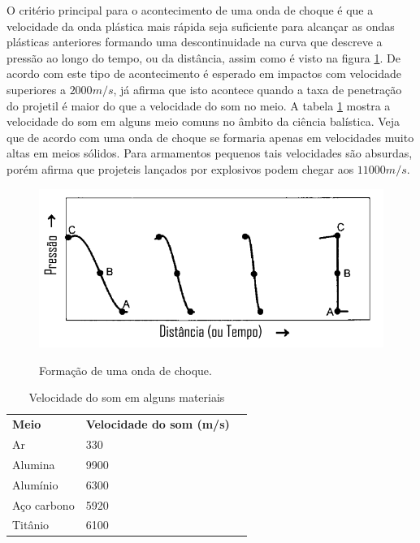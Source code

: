  O critério principal para o acontecimento de uma onda de choque é que a velocidade da onda plástica mais rápida seja suficiente para alcançar as ondas plásticas anteriores formando uma descontinuidade na curva que descreve a pressão ao longo do tempo, ou da distância, assim como é visto na figura \ref{fig:buildshock}. De acordo com \cite{Zukas} este tipo de acontecimento é esperado em impactos com velocidade superiores a $2000 m/s$, já \cite{Hazell} afirma que isto acontece quando a taxa de penetração do projetil é maior do que a velocidade do som no meio. A tabela \ref{tab:veldosom} mostra a velocidade do som em alguns meio comuns no âmbito da ciência balística. Veja que de acordo com \cite{Hazell} uma onda de choque se formaria apenas em velocidades muito altas em meios sólidos. Para armamentos pequenos tais velocidades são absurdas, porém \cite{Hazell} afirma que projeteis lançados por explosivos podem chegar aos $11000 m/s$.
 
  \begin{figure} [H]
     \centering
     \caption{Formação de uma onda de choque.}
     \includegraphics[width=0.5\linewidth]{images/buildshock.png}
     \label{fig:buildshock}
 \end{figure}
 
 \begin{table}[H]
     \centering
     \caption{Velocidade do som em alguns materiais}
\begin{tabular}{|l|l|l}
\cline{1-2}
\textbf{Meio} & \textbf{Velocidade do som (m/s)} &  \\ \cline{1-2}
Ar            & 330                              &  \\ \cline{1-2}
Alumina       & 9900                             &  \\ \cline{1-2}
Alumínio      & 6300                             &  \\ \cline{1-2}
Aço carbono   & 5920                             &  \\ \cline{1-2}
Titânio       & 6100                             &  \\ \cline{1-2}
\end{tabular}
     \label{tab:veldosom}
 \end{table}
 
